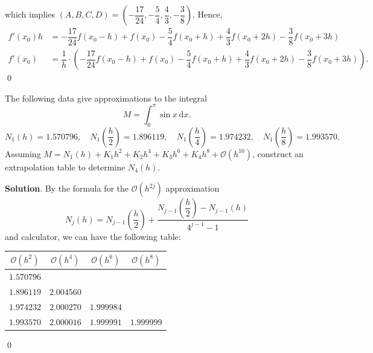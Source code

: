 \documentclass[11pt]{article}
\theoremstyle{break}
\newcommand{\ddi}{\text{$\,$d}}
\numberwithin{equation}{theorem}
\begin{document}
\noindent which implies $\left(A, B, C, D\right)=\left(-\dfrac{17}{24}, -\dfrac{5}{4}, \dfrac{4}{3}, -\dfrac{3}{8}\right)$. Hence, 
\begin{align*}
    f'(x_0)h&=-\dfrac{17}{24}f(x_0-h)+f(x_0)-\dfrac{5}{4}f(x_0+h)+\dfrac{4}{3}f(x_0+2h)-\dfrac{3}{8}f(x_0+3h)\\
    f'(x_0)&=\dfrac{1}{h}\cdot\left(-\dfrac{17}{24}f(x_0-h)+f(x_0)-\dfrac{5}{4}f(x_0+h)+\dfrac{4}{3}f(x_0+2h)-\dfrac{3}{8}f(x_0+3h)\right).
\end{align*}
\qed

\newpage
\begin{problem}\label{problem 4} %
    The following data give approximations to the integral $$M=\int_0^\pi\sin x\ddi x.$$
    $$N_1(h)=1.570796, \quad N_1\left(\dfrac{h}{2}\right)=1.896119, \quad N_1\left(\dfrac{h}{4}\right)=1.974232, \quad N_1\left(\dfrac{h}{8}\right)=1.993570.$$
    Assuming $M=N_1(h)+K_1h^2+K_2h^4+K_3h^6+K_4h^8+\mathcal{O}(h^{10})$, construct an extrapolation table to determine $N_4(h)$.
\end{problem}
\textbf{Solution}. By the formula for the $\mathcal{O}(h^{2j})$ approximation $$N_j(h)=N_{j-1}\left(\dfrac{h}{2}\right)+\dfrac{N_{j-1}\left(\dfrac{h}{2}\right)-N_{j-1}(h)}{4^{j-1}-1}$$ and calculator, we can have the following table:
\begin{center}
    \begin{tabular}{c|c|c|c}
        $\mathcal{O}(h^2)$ & $\mathcal{O}(h^4)$ & $\mathcal{O}(h^6)$ & $\mathcal{O}(h^8)$\\
        \hline
        $1.570796$ &&& \\
        \hline
        $1.896119$ & $2.004560$ && \\
        \hline
        $1.974232$ & $2.000270$ & $1.999984$ & \\
        \hline
        $1.993570$ & $2.000016$ & $1.999991$ & $1.999999$
    \end{tabular}
\end{center}
\qed
\end{document}
